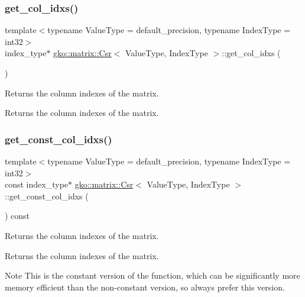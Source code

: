 \subsubsection{\texorpdfstring{get\+\_\+col\+\_\+idxs()}{get\_col\_idxs()}}
{\footnotesize\ttfamily template$<$typename Value\+Type = default\+\_\+precision, typename Index\+Type = int32$>$ \\
index\+\_\+type$\ast$ \hyperlink{classgko_1_1matrix_1_1Csr}{gko\+::matrix\+::\+Csr}$<$ Value\+Type, Index\+Type $>$\+::get\+\_\+col\+\_\+idxs (\begin{DoxyParamCaption}{ }\end{DoxyParamCaption})\hspace{0.3cm}{\ttfamily [noexcept]}}



Returns the column indexes of the matrix. 

\begin{DoxyReturn}{Returns}
the column indexes of the matrix. 
\end{DoxyReturn}
\mbox{\label{classgko_1_1matrix_1_1Csr_ac9d640d26449e0ee46c7cb2b80100d65}} 
\subsubsection{\texorpdfstring{get\+\_\+const\+\_\+col\+\_\+idxs()}{get\_const\_col\_idxs()}}
{\footnotesize\ttfamily template$<$typename Value\+Type = default\+\_\+precision, typename Index\+Type = int32$>$ \\
const index\+\_\+type$\ast$ \hyperlink{classgko_1_1matrix_1_1Csr}{gko\+::matrix\+::\+Csr}$<$ Value\+Type, Index\+Type $>$\+::get\+\_\+const\+\_\+col\+\_\+idxs (\begin{DoxyParamCaption}{ }\end{DoxyParamCaption}) const\hspace{0.3cm}{\ttfamily [noexcept]}}



Returns the column indexes of the matrix. 

\begin{DoxyReturn}{Returns}
the column indexes of the matrix.
\end{DoxyReturn}
\begin{DoxyNote}{Note}
This is the constant version of the function, which can be significantly more memory efficient than the non-\/constant version, so always prefer this version. 
\end{DoxyNote}
\mbox{\label{classgko_1_1matrix_1_1Csr_a50c9ce521649450d7ae5ff488e42c190}} 
